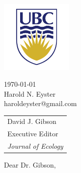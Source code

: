 \documentclass[11pt]{article}
\begin{document}
	\hspace{2.8in}
	\begin{minipage}{2in}
	\includegraphics[width=100pt]{ubc}
	\end{minipage}
\hfill
	\begin{minipage}{3in}
	\today \\[\jot]
	Harold N. Eyster\\
	haroldeyster@gmail.com
	\end{minipage}
	\medskip
	\begin{tabular}{@{}l}
		David J. Gibson \\
		Executive Editor \\
		\textit{Journal of Ecology} \\
	\end{tabular}
	
	\bigskip
	
	Dear Dr. Gibson,
	
\end{document}
